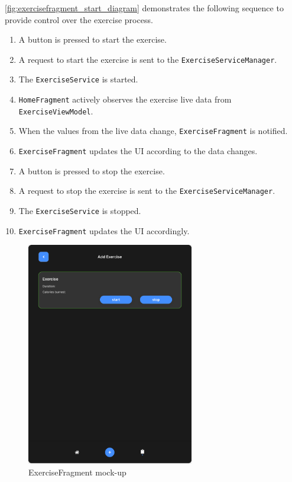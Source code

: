 \autoref{fig:exercisefragment_start_diagram} demonstrates the following sequence to provide control over the exercise process.
\begin{enumerate}
    \item A button is pressed to start the exercise.
    \item A request to start the exercise is sent to the \texttt{ExerciseServiceManager}.
    \item The \texttt{ExerciseService} is started.
    \item \texttt{HomeFragment} actively observes the exercise live data from \texttt{ExerciseViewModel}.
    \item When the values from the live data change, \texttt{ExerciseFragment} is notified.
    \item \texttt{ExerciseFragment} updates the UI according to the data changes.
    \item A button is pressed to stop the exercise.
    \item A request to stop the exercise is sent to the \texttt{ExerciseServiceManager}.
    \item The \texttt{ExerciseService} is stopped.
    \item \texttt{ExerciseFragment} updates the UI accordingly.
\end{enumerate}

\begin{figure}[H]
    \centering
    \includegraphics[width=0.65\textwidth]{images/exercise-fragment-mockup.png}
    \caption{ExerciseFragment mock-up}
    \label{fig:exercisefragment_mockup}
\end{figure}

